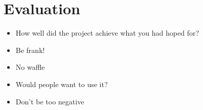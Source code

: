 \chapter{Evaluation}
\label{chap:evaluation}


\begin{itemize}
  \item How well did the project achieve what you had hoped for?
  \item Be frank!
  \item No waffle
  \item Would people want to use it?
  \item Don't be too negative
\end{itemize}


